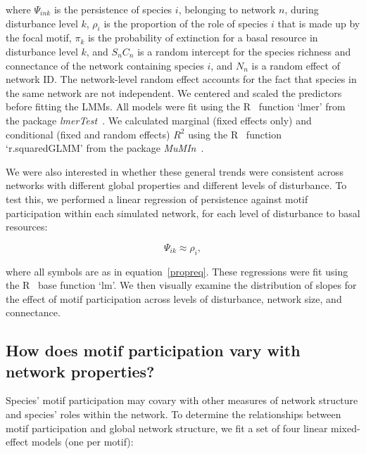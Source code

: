 \documentclass[12pt]{article}
\begin{document}
\begin{spacing}{2.0}
        \noindent where $\Psi_{ink}$ is the persistence of species $i$, belonging to network $n$, during disturbance level $k$, $\rho_{i}$ is the proportion of the role of species $i$ that is made up by the focal motif, $\pi_{k}$ is the probability of extinction for a basal resource in disturbance level $k$, and $S_{n}C_{n}$ is a random intercept for the species richness and connectance of the network containing species $i$, and $N_n$ is a random effect of network ID.
        The network-level random effect accounts for the fact that species in the same network are not independent.
        We centered and scaled the predictors before fitting the LMMs.
        All models were fit using the R~\citep{R} function `lmer' from the package \emph{lmerTest}~\citep{lmerTest}.
        We calculated marginal (fixed effects only) and conditional (fixed and random effects) $R^2$ using the R~\citep{R} function `r.squaredGLMM' from the package \emph{MuMIn}~\citep{MuMIn}.

        
        We were also interested in whether these general trends were consistent across networks with different global properties and different levels of disturbance. 
        To test this, we performed a linear regression of persistence against motif participation within each simulated network, for each level of disturbance to basal resources:

        \begin{equation}
            \Psi_{ik} \approx \rho_{i} ,
            \label{mineq}
        \end{equation}

        \noindent where all symbols are as in equation~\ref{propreq}.
        These regressions were fit using the R~\citep{R} base function `lm'.
        We then visually examine the distribution of slopes for the effect of motif participation across levels of disturbance, network size, and connectance. 


    \subsection{How does motif participation vary with network properties?}

        Species' motif participation may covary with other measures of network structure and species' roles within the network.
        To determine the relationships between motif participation and global network structure, we fit a set of four linear mixed-effect models (one per motif):


\end{spacing}
\end{document}
